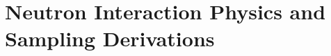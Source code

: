 \chapter{Neutron Interaction Physics and Sampling Derivations}
\begin{figure}[t!]
  \begin{center}
    
  \end{center}
  \caption{}
  \label{fig:lab_cm_scattering_angles}
\end{figure}